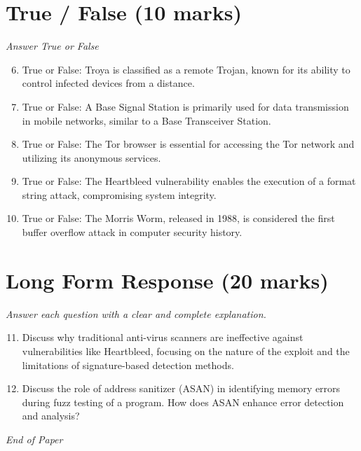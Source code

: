 \documentclass[12pt]{article}
\begin{document}
\section*{True / False (10 marks)}
\textit{Answer True or False}
\begin{enumerate}[label=\arabic*.]
\setcounter{enumi}{5}
\item True or False: Troya is classified as a remote Trojan, known for its ability to control infected devices from a distance.
\item True or False: A Base Signal Station is primarily used for data transmission in mobile networks, similar to a Base Transceiver Station.
\item True or False: The Tor browser is essential for accessing the Tor network and utilizing its anonymous services.
\item True or False: The Heartbleed vulnerability enables the execution of a format string attack, compromising system integrity.
\item True or False: The Morris Worm, released in 1988, is considered the first buffer overflow attack in computer security history.
\end{enumerate}

\section*{Long Form Response (20 marks)}
\textit{Answer each question with a clear and complete explanation.}
\begin{enumerate}[label=\arabic*.]
\setcounter{enumi}{10}
\item Discuss why traditional anti-virus scanners are ineffective against vulnerabilities like Heartbleed, focusing on the nature of the exploit and the limitations of signature-based detection methods.
\item Discuss the role of address sanitizer (ASAN) in identifying memory errors during fuzz testing of a program. How does ASAN enhance error detection and analysis?
\end{enumerate}

\vfill
\noindent\textit{End of Paper}
\end{document}
